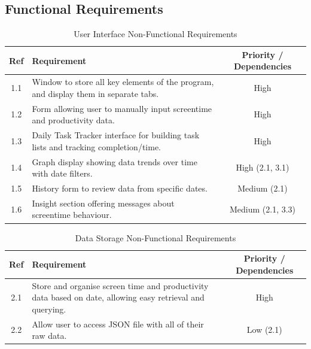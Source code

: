 \documentclass[12pt,a4paper]{article}
\begin{document}
\subsection{Functional Requirements}
\begin{table}[h]
    \centering
    \small %
    \renewcommand{\arraystretch}{1.2} %
    \begin{tabular}{|c|p{8.5cm}|c|} %
        \hline
        \textbf{Ref} & \textbf{Requirement} & \textbf{Priority / Dependencies} \\
        \hline
        1.1 & Window to store all key elements of the program, and display them in separate tabs. & High \\
        \hline
        1.2 & Form allowing user to manually input screentime and productivity data. & High \\
        \hline
        1.3 & Daily Task Tracker interface for building task lists and tracking completion/time. & High \\
        \hline
        1.4 & Graph display showing data trends over time with date filters. & High (2.1, 3.1) \\
        \hline
        1.5 & History form to review data from specific dates. & Medium (2.1) \\
        \hline
        1.6 & Insight section offering messages about screentime behaviour. & Medium (2.1, 3.3) \\
        \hline
    \end{tabular}
    \caption{User Interface Non-Functional Requirements}
    \label{tab:user_interface}
\end{table}

\begin{table}[h]
    \centering
    \small
    \renewcommand{\arraystretch}{1.3}
    \begin{tabular}{|c|p{10cm}|c|}
        \hline
        \textbf{Ref} & \textbf{Requirement} & \textbf{Priority / Dependencies} \\
        \hline
        2.1 & Store and organise screen time and productivity data based on date, allowing easy retrieval and querying. & High \\
        \hline
        2.2 & Allow user to access JSON file with all of their raw data. & Low (2.1) \\
        \hline
    \end{tabular}
    \caption{Data Storage Non-Functional Requirements}
    \label{tab:data_storage}
\end{table}
\end{document}
